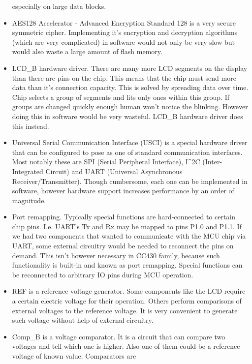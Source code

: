 \begin{itemize}
       especially on large data blocks.
 \item AES128 Accelerator - Advanced Encryption Standard 128 is a very
       secure symmetric cipher. Implementing it's encryption and
       decryption algorithms (which are very complicated) in software
       would not only be very slow but would also waste a large
       amount of flash memory.
 \item LCD\_B hardware driver. There are many more LCD segments on the
       display than there are pins on the chip. This means that the
       chip must send more data than it's connection capacity. This is
       solved by spreading data over time. Chip selects a group of
       segments and lits only ones within this group. If groups are
       changed quickly enough human won't notice the blinking. However
       doing this in software would be very wasteful. LCD\_B hardware
       driver does this instead.
 \item Universal Serial Communication Interface (USCI) is a special
       hardware driver that can be configured to pose as one of
       standard communication interfaces. Most notably these are SPI
       (Serial Peripheral Interface), I$\^$2C (Inter-Integrated Circuit)
       and UART (Universal Asynchronous Receiver/Transmitter). Though
       cumbersome, each one can be implemented in software, however
       hardware support increases performance by an order of
       magnitude.
 \item Port remapping. Typically special functions are hard-connected to
       certain chip pins. I.e. UART's Tx and Rx may be mapped to pins
       P1.0 and P1.1. If we had two components that wanted to
       communicate with the MCU chip via UART, some external circuitry
       would be needed to reconnect the pins on demand. This isn't
       however necessary in CC430 family, because such functionality is
       built-in and known as port remapping. Special functions can
       be reconnected to arbitrary IO pins during MCU operation.
 \item REF is a reference voltage generator. Some components like the
     LCD require a certain electric voltage for their operation.
     Others perform comparisons of external voltages to the reference
     voltage. It is very convenient to generate such voltage without
     help of external circuitry.
 \item Comp\_B is a voltage comparator. It is a circuit that can
     compare two voltages and tell which one is higher. Also one of
     them could be a reference voltage of known value. Comparators are

\end{itemize}

